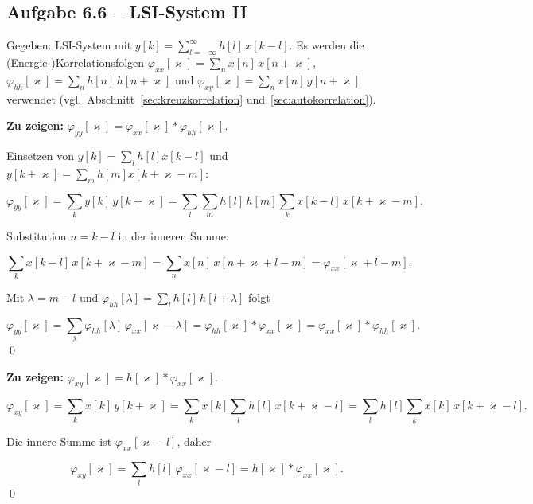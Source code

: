 \subsection*{Aufgabe 6.6 – LSI-System II}

Gegeben: LSI-System mit $y[k]=\sum_{l=-\infty}^{\infty} h[l]\,x[k-l]$.
Es werden die (Energie-)Korrelationsfolgen
$\varphi_{xx}[\varkappa]=\sum_{n}x[n]\,x[n+\varkappa]$,
$\varphi_{hh}[\varkappa]=\sum_{n}h[n]\,h[n+\varkappa]$ und
$\varphi_{xy}[\varkappa]=\sum_{n}x[n]\,y[n+\varkappa]$ verwendet
(vgl.\ Abschnitt~\ref{sec:kreuzkorrelation} und~\ref{sec:autokorrelation}).

\begin{beweis}

\textbf{Zu zeigen:} $\varphi_{yy}[\varkappa]=\varphi_{xx}[\varkappa]*\varphi_{hh}[\varkappa]$.

Einsetzen von $y[k]=\sum_l h[l]x[k-l]$ und $y[k+\varkappa]=\sum_m h[m]x[k+\varkappa-m]$:

$$
\varphi_{yy}[\varkappa]=\sum_k y[k]\,y[k+\varkappa]
 =\sum_l\sum_m h[l]\,h[m]\sum_k x[k-l]\,x[k+\varkappa-m].
$$

Substitution $n=k-l$ in der inneren Summe:

$$
\sum_k x[k-l]\,x[k+\varkappa-m]=\sum_n x[n]\,x[n+\varkappa+l-m]
 =\varphi_{xx}[\varkappa+l-m].
$$

Mit $\lambda=m-l$ und $\varphi_{hh}[\lambda]=\sum_l h[l]\,h[l+\lambda]$ folgt

$$
\varphi_{yy}[\varkappa]
 =\sum_{\lambda}\varphi_{hh}[\lambda]\,\varphi_{xx}[\varkappa-\lambda]
 =\varphi_{hh}[\varkappa]*\varphi_{xx}[\varkappa]
 =\varphi_{xx}[\varkappa]*\varphi_{hh}[\varkappa].
$$
\qed

\end{beweis}

\begin{beweis}

\textbf{Zu zeigen:} $\varphi_{xy}[\varkappa]=h[\varkappa]*\varphi_{xx}[\varkappa]$.

$$
\varphi_{xy}[\varkappa]=\sum_k x[k]\,y[k+\varkappa]
 =\sum_k x[k]\sum_l h[l]\,x[k+\varkappa-l]
 =\sum_l h[l]\sum_k x[k]\,x[k+\varkappa-l].
$$

Die innere Summe ist $\varphi_{xx}[\varkappa-l]$, daher

$$
\varphi_{xy}[\varkappa]=\sum_l h[l]\,\varphi_{xx}[\varkappa-l]
 =h[\varkappa]*\varphi_{xx}[\varkappa].
$$
\qed

\end{beweis}

